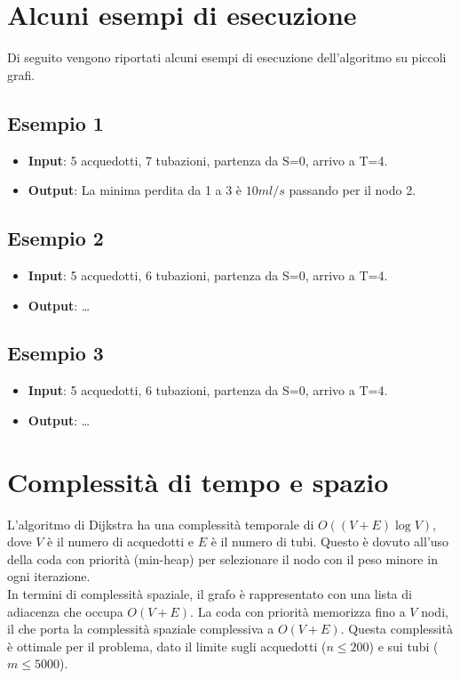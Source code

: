 \documentclass[a4paper,12pt]{article}
\begin{document}
\clearpage

\section{Alcuni esempi di esecuzione}
Di seguito vengono riportati alcuni esempi di esecuzione dell'algoritmo su piccoli grafi.

\subsection*{Esempio 1}
\begin{itemize}
    \item \textbf{Input}: 5 acquedotti, 7 tubazioni, partenza da S=0, arrivo a T=4.   
    \item \textbf{Output}: La minima perdita da 1 a 3 è $10ml/s$ passando per il nodo 2.
\end{itemize}

\subsection*{Esempio 2}
\begin{itemize}
    \item \textbf{Input}: 5 acquedotti, 6 tubazioni, partenza da S=0, arrivo a T=4.
    \item \textbf{Output}: \ldots
\end{itemize}

\subsection*{Esempio 3}
\begin{itemize}
    \item \textbf{Input}: 5 acquedotti, 6 tubazioni, partenza da S=0, arrivo a T=4.
    \item \textbf{Output}: \ldots
\end{itemize}

\section{Complessità di tempo e spazio}
L'algoritmo di Dijkstra ha una complessità temporale di $O((V+E)\log V)$, dove $V$ è 
il numero di acquedotti e $E$ è il numero di tubi. 
Questo è dovuto all'uso della coda con priorità (min-heap) per selezionare il nodo 
con il peso minore in ogni iterazione. \\

In termini di complessità spaziale, il grafo è rappresentato con una lista 
di adiacenza che occupa $O(V+E)$. La coda con priorità memorizza fino a $V$ nodi, 
il che porta la complessità spaziale complessiva a $O(V+E)$. 
Questa complessità è ottimale per il problema, dato il limite 
sugli acquedotti ($n \leq 200$) e sui tubi ($m \leq 5000$).
\end{document}
